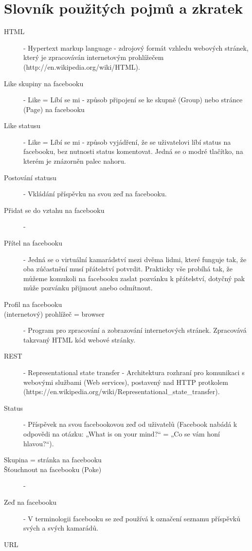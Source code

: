 \documentclass[thesis=M,czech]{FITthesis}[2013/05/10]
\begin{document}
\chapter{Slovník použitých pojmů a zkratek}
\begin{description}
	\item[HTML] - Hypertext markup language - zdrojový formát vzhledu webových stránek, který je zpracováván internetovým prohlížečem
		\newline(http://en.wikipedia.org/wiki/HTML).
	\item[Like skupiny na facebooku] - Like = Líbí se mi - způsob připojení se ke skupně (Group) nebo stránce (Page) na facebooku
	\item[Like statusu] - Like = Líbí se mi - způsob vyjádření, že se uživatelovi líbí status na facebooku, bez nutnosti status komentovat. Jedná se o modré tlačítko, na kterém je znázorněn palec nahoru.
	\item[Postování statusu] - Vkládání příspěvku na svou zeď na  facebooku.
	\item[Přidat se do vztahu na facebooku] - 
	\item[Přítel na facebooku] - Jedná se o virtuální kamarádství mezi dvěma lidmi, které funguje tak, že oba zúčastnění musí přátelství potvrdit. Prakticky vše probíhá tak, že můžeme komukoli na facebooku zaslat pozvánku k přátelství, dotyčný pak může pozvánku přijmout anebo odmítnout.  
	\item[Profil na facebooku]
	\item[(internetový) prohlížeč = browser] - Program pro zpracování a zobrazování internetových stránek. Zpracovává takzvaný HTML kód webové stránky.
	\item[REST] - Representational state transfer - Architektura rozhraní pro komunikaci s webovými službami (Web services), postavený nad HTTP protkolem
\newline(https://en.wikipedia.org/wiki/Representational\_state\_transfer).
	\item[Status] - Příspěvek na svou facebookovou zeď od uživatelů (Facebook nabádá k odpovědi na otázku: „What is on your mind?“ = „Co se vám honí hlavou?“).
	\item[Skupina = stránka na facebooku]
	\item[Šťouchnout na facebooku (Poke)] -
	\item[Zeď na facebooku] - V terminologii facebooku se zeď používá k označení seznamu příspěvků svých a svých kamarádů.
	\item[URL]
\end{description}
\end{document}
